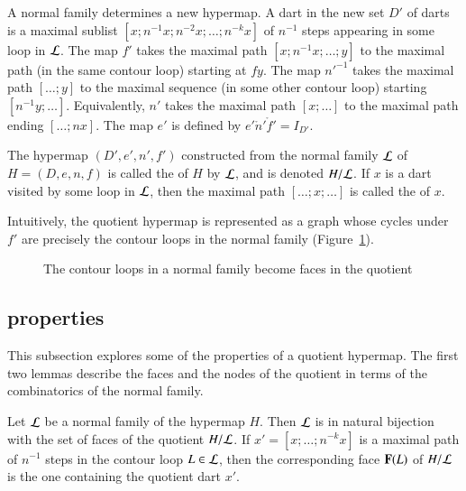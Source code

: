 A normal family determines a new hypermap.  A dart in the new set $D'$
of darts is a maximal sublist $[x;n^{-1} x; n^{-2} x;\ldots;n^{-k}
x]$ of $n^{-1}$ steps appearing in some loop in $\cal L$. The map $f'$
takes the maximal path $[x;n^{-1}x;\ldots;y]$ to the maximal path (in
the same contour loop) starting at $f y$. The map ${n'}^{-1}$ takes
the maximal path $[\ldots;y]$ to the maximal sequence (in some other
contour loop) starting $[n^{-1}y;\ldots]$. Equivalently, $n'$ takes
the maximal path $[x;\ldots]$ to the maximal path ending $[\ldots;n
x]$. The map $e'$ is defined by $e'\ocirc n'\ocirc f' = I_{D'}$.
%

\begin{definition}[quotient] The hypermap $(D',e',n',f')$
constructed from the normal
family $\cal L$ of $H=(D,e,n,f)$ 
is called the  of $H$ by $\cal L$, and is denoted
$H/{\cal L}$.  If $x$ is a dart visited by some loop in $\cal L$, then
the maximal path $[\ldots;x;\ldots]$ is called the  of $x$.
%
\end{definition}
%
%
%
%

Intuitively, the quotient hypermap is represented as a graph whose
cycles under $f'$ are precisely the contour loops in the normal family
(Figure~\ref{fig:quot}).


\begin{figure}[htb]
\centering
{}
\caption{The contour loops in a normal family become faces in the
quotient}
\label{fig:quot}
\end{figure}

\subsection{properties}

This subsection explores some of the properties of a quotient hypermap.
The first two lemmas describe the faces and the nodes of the quotient
in terms of the combinatorics of the normal family.

\begin{lemma}\label{lemma:quotient-bijection}
  Let ${\cal L}$ be a normal family of the hypermap $H$.  Then ${\cal
    L}$ is in natural bijection with the set of faces of the quotient
  $H/{\cal L}$.  If $x'=[x;\ldots;n^{-k}x]$ is a maximal path of
  $n^{-1}$ steps in the contour loop $L\in{\cal L}$, then the
  corresponding face ${\mathbf F}(L)$ of $H/{\cal L}$ is the
  one containing the quotient dart $x'$.
\end{lemma}

